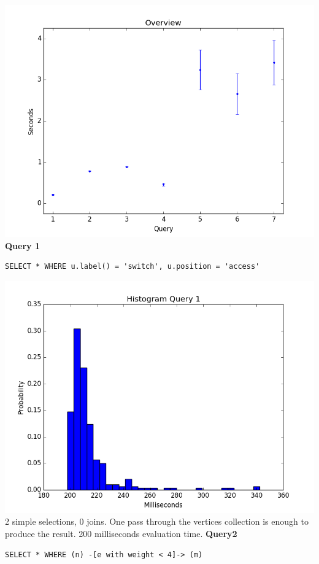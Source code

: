 \documentclass[11pt,singlecolumn]{scrartcl}
\begin{document}
\includegraphics[width=1\textwidth]{overview}
\clearpage
\textbf{Query 1}\\
\begin{verbatim}
SELECT * WHERE u.label() = 'switch', u.position = 'access'
\end{verbatim}
\includegraphics[width=1\textwidth]{q1}
2 simple selections, 0 joins. One pass through the vertices collection is enough to produce the result. 200 milliseconds evaluation time.
\clearpage
\textbf{Query2}\\
\begin{verbatim}
SELECT * WHERE (n) -[e with weight < 4]-> (m)\end{verbatim}
\end{document}
